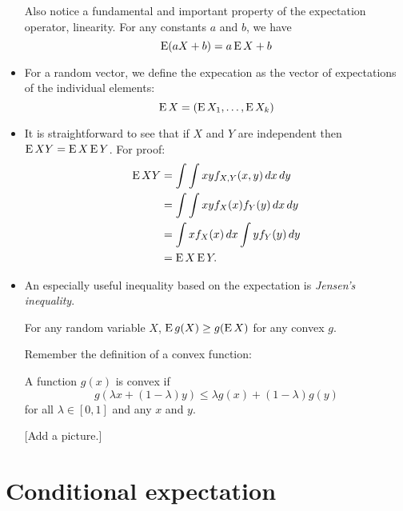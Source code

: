 \begin{itemize}[leftmargin=0pt]
  Also notice a fundamental and important property of the expectation
  operator, linearity.  For any constants $a$ and $b$, we have
  \begin{equation*}
    \operatorname{E}(a X + b) = a \operatorname{E} X + b
  \end{equation*}

\item For a random vector, we define the expecation as the vector of
  expectations of the individual elements:
  \begin{equation*}
    \operatorname{E} X = (\operatorname{E} X_1,\dots,\operatorname{E} X_k)
  \end{equation*}

\item It is straightforward to see that if $X$ and $Y$ are
  independent then $\operatorname{E} XY = \operatorname{E} X \operatorname{E} Y$.  For proof:
  \begin{align*}
    \operatorname{E} XY
    &= \int\int x y f_{X,Y}(x,y) \,dx \,dy \\
    &= \int\int xy f_X(x) f_Y(y) \,dx \,dy \\
    &= \int x f_X(x) \,dx \int y f_Y(y) \,dy \\
    &= \operatorname{E} X \operatorname{E} Y.
  \end{align*}

\item An especially useful inequality based on the expectation is
  \emph{Jensen's inequality}.
  \begin{thm}
    For any random variable $X$, $\operatorname{E} g(X) \geq g(\operatorname{E} X)$ for any convex
    $g$.
  \end{thm}

  Remember the definition of a convex function:
  \begin{defn}
    A function $g(x)$ is convex if 
    \begin{equation*}
      g( \lambda x + (1-\lambda) y ) \leq \lambda g(x) + (1-\lambda) g(y) 
    \end{equation*}
    for all $\lambda \in [0,1]$ and any $x$ and $y$.
  \end{defn}

  [Add a picture.]

\end{itemize}

\section{Conditional expectation}

